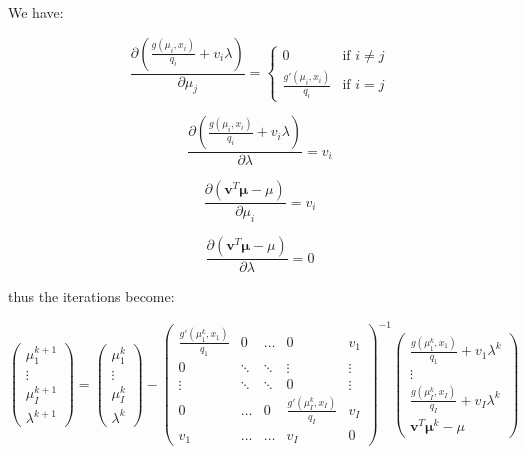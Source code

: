 \documentclass{tex/note}
\begin{document}
We have:

\begin{equation*}
\frac{\partial \left( \frac{g \left( \mu_i , x_i \right)}{q_i} + v_i \lambda \right)}{\partial \mu_j} =
\begin{cases}
0 & \text{if } i \neq j \\
\frac{g' \left( \mu_i , x_i \right)}{q_i} & \text{if } i = j
\end{cases}
\end{equation*}

\begin{equation*}
\frac{\partial \left( \frac{g \left( \mu_i , x_i \right)}{q_i} + v_i \lambda \right)}{\partial \lambda} = v_i
\end{equation*}

\begin{equation*}
\frac{\partial \left( \bm{v}^T \bm{\mu} - \mu \right)}{\partial \mu_i} = v_i
\end{equation*}

\begin{equation*}
\frac{\partial \left( \bm{v}^T \bm{\mu} - \mu \right)}{\partial \lambda} = 0
\end{equation*}

thus the iterations become:

\begin{equation*}
\begin{pmatrix} \mu_1^{k + 1} \\ \vdots \\ \mu_I^{k + 1} \\ \lambda^{k + 1} \end{pmatrix} = \begin{pmatrix} \mu_1^k \\ \vdots \\ \mu_I^k \\ \lambda^k \end{pmatrix} - \begin{pmatrix} \frac{g' \left( \mu_1^k , x_1 \right)}{q_1} & 0 & \hdots & 0 & v_1 \\ 0 & \ddots & \ddots & \vdots & \vdots \\ \vdots & \ddots & \ddots & 0 & \vdots \\ 0 & \hdots & 0 & \frac{g' \left( \mu_I^k , x_I \right)}{q_I} & v_I \\ v_1 & \hdots & \hdots & v_I & 0 \end{pmatrix} ^{-1} \begin{pmatrix} \frac{g \left( \mu_1^k , x_1 \right)}{q_1} + v_1 \lambda^k \\ \vdots \\ \frac{g \left( \mu_I^k , x_I \right)}{q_I} + v_I \lambda^k \\ \bm{v}^T \bm{\mu}^k - \mu  \end{pmatrix}
\end{equation*}
\end{document}
